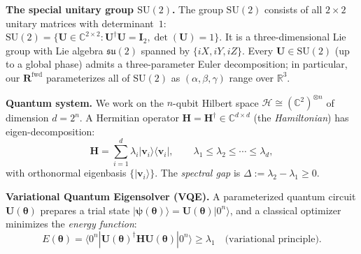 \documentclass[11pt]{article}
\newcommand{\SU}{\mathrm{SU}}
\newcommand{\su}{\mathfrak{su}}
\newcommand{\cH}{\mathcal{H}}
\newcommand{\bbR}{\mathbb{R}}
\newcommand{\bbC}{\mathbb{C}}
\theoremstyle{plain}
\theoremstyle{plain}
\begin{document}
\noindent\textbf{The special unitary group $\SU(2)$.}
The group $\SU(2)$ consists of all $2\times 2$ unitary matrices with
determinant~$1$:
$\SU(2)=\{\mathbf{U}\in\bbC^{2\times 2}:\mathbf{U}^{\dagger}\mathbf{U}=\mathbf{I}_2, \det(\mathbf{U})=1\}$.
It is a three-dimensional Lie group with Lie algebra $\su(2)$
spanned by $\{iX, iY, iZ\}$.  Every $\mathbf{U}\in\SU(2)$ (up to a global
phase) admits a three-parameter Euler decomposition; in particular,
our $\mathbf{R}^{\mathrm{fwd}}$ parameterizes all of $\SU(2)$ as
$(\alpha,\beta,\gamma)$ range over $\bbR^3$.

\medskip\noindent\textbf{Quantum system.}
We work on the $n$-qubit Hilbert space
$\cH\cong(\bbC^{2})^{\otimes n}$ of dimension $d=2^n$.  A Hermitian
operator $\mathbf{H}=\mathbf{H}^\dagger\in\bbC^{d\times d}$ (the \emph{Hamiltonian})
has eigen-decomposition:
\begin{equation}\label{eq:eigdecomp}
  \mathbf{H} = \sum_{i=1}^{d}\lambda_i|\mathbf{v}_i\rangle\langle \mathbf{v}_i|,
  \qquad
  \lambda_1\le\lambda_2\le\cdots\le\lambda_d,
\end{equation}
with orthonormal eigenbasis $\{|\mathbf{v}_i\rangle\}$.  The \emph{spectral gap}
is $\Delta:=\lambda_2-\lambda_1\ge 0$.

\medskip\noindent\textbf{Variational Quantum Eigensolver (VQE).}
A parameterized quantum circuit $\mathbf{U}(\bm\theta)$ prepares a trial state
$|\boldsymbol{\psi}(\bm\theta)\rangle=\mathbf{U}(\bm\theta)|0^n\rangle$, and a classical
optimizer minimizes the \emph{energy function}:
\begin{equation}\label{eq:vqe_energy}
  E(\bm\theta)
  = \langle 0^n|\mathbf{U}(\bm\theta)^{\dagger} \mathbf{H} \mathbf{U}(\bm\theta)|0^n\rangle
  \ge\lambda_1
  \quad\text{(variational principle)}.
\end{equation}
\end{document}
